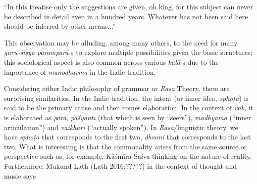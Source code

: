\begin{myquote}
“In this treatise only the suggestions are given, oh king, for this subject can never be described in detail even in a hundred years. Whatever has not been said here should be inferred by other means...” 
\end{myquote}

This observation may be alluding, among many others, to the need for many \textsl{guru-śiṣya paramparā}-s to explore multiple possibilities given the basic structures; this sociological aspect is also common across various \textsl{kalā}-s due to the importance of \textsl{manodharma} in the Indic tradition. 

\newpage

Considering either Indic philosophy of grammar or \textsl{Rasa} Theory, there are surprising similarities. In the Indic tradition, the intent (or inner idea, \textsl{sphoṭa}) is said to be the primary cause and then comes elaboration. In the context of \textsl{vāk}, it is elaborated as \textsl{parā}, \textsl{paśyantī} (that which is seen by “seers”), \textsl{madhyamā} (“inner articulation”) and \textsl{vaikharī} (“actually spoken”). In \textsl{Rasa}/linguistic theory, we have \textsl{sphoṭa} that corresponds to the first two, \textsl{dhvani} that corresponds to the last two. What is interesting is that the commonality arises from the same source or perspective such as, for example, Kāśmīra Śaiva thinking on the nature of reality. Furthermore, Mukund Lath (Lath 2016:?????) in the context of thought and music says 

